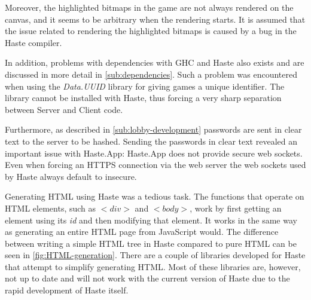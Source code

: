 \documentclass[a4paper]{article}
\begin{document}
Moreover, the highlighted bitmaps in the game are not always rendered on the canvas, and it seems to be arbitrary when the rendering starts. It is assumed that the issue related to rendering the highlighted bitmaps is caused by a bug in the Haste compiler.


In addition, problems with dependencies with GHC and Haste also exists and are discussed in more detail in \cref{sub:dependencies}. Such a problem was encountered when using the \textit{Data.UUID} library for giving games a unique identifier. The library cannot be installed with Haste, thus forcing a very sharp separation between Server and Client code. 

Furthermore, as described in \cref{sub:lobby-development} passwords are sent in clear text to the server to be hashed. Sending the passwords in clear text revealed an important issue with Haste.App: Haste.App does not provide secure web sockets. Even when forcing an HTTPS connection via the web server the web sockets used by Haste always default to insecure. 


Generating HTML using Haste was a tedious task. The functions that operate on HTML elements, such as $<div>$ and $<body>$, work by first getting an element using its \textit{id} and then modifying that element. It works in the same way as generating an entire HTML page from JavaScript would. The difference between writing a simple HTML tree in Haste compared to pure HTML can be seen in \cref{fig:HTML-generation}. There are a couple of libraries developed for Haste that attempt to simplify generating HTML. Most of these libraries are, however, not up to date and will not work with the current version of Haste due to the rapid development of Haste itself. 
\end{document}
